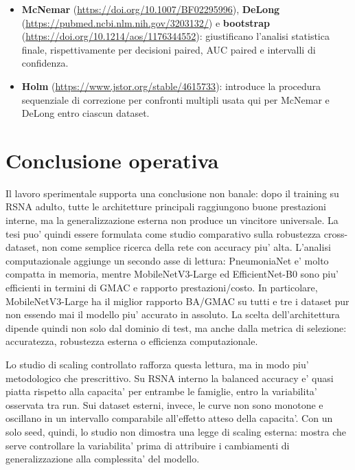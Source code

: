 \documentclass[11pt,a4paper]{article}
\newcommand{\balacc}{balanced accuracy}
\begin{document}
\begin{itemize}
  dell'esperimento multi-classe come test di trasferibilita' delle feature
  apprese sul task binario.
  \item \textbf{McNemar} \cite{mcnemar1947}
  (\url{https://doi.org/10.1007/BF02295996}), \textbf{DeLong}
  \cite{delong1988} (\url{https://pubmed.ncbi.nlm.nih.gov/3203132/}) e
  \textbf{bootstrap} \cite{efron1979bootstrap}
  (\url{https://doi.org/10.1214/aos/1176344552}): giustificano l'analisi
  statistica finale, rispettivamente per decisioni paired, AUC paired e
  intervalli di confidenza.
  \item \textbf{Holm} \cite{holm1979}
  (\url{https://www.jstor.org/stable/4615733}): introduce la procedura
  sequenziale di correzione per confronti multipli usata qui per McNemar e
  DeLong entro ciascun dataset.
\end{itemize}

\section{Conclusione operativa}

Il lavoro sperimentale supporta una conclusione non banale: dopo il training su
RSNA adulto, tutte le architetture principali raggiungono buone prestazioni
interne, ma la generalizzazione esterna non produce un vincitore universale. La
tesi puo' quindi essere formulata come studio comparativo sulla robustezza
cross-dataset, non come semplice ricerca della rete con accuracy piu' alta.
L'analisi computazionale aggiunge un secondo asse di lettura: PneumoniaNet e'
molto compatta in memoria, mentre MobileNetV3-Large ed EfficientNet-B0 sono piu'
efficienti in termini di GMAC e rapporto prestazioni/costo. In particolare,
MobileNetV3-Large ha il miglior rapporto BA/GMAC su tutti e tre i dataset pur
non essendo mai il modello piu' accurato in assoluto. La scelta
dell'architettura dipende quindi non solo dal dominio di test, ma anche dalla
metrica di selezione: accuratezza, robustezza esterna o efficienza
computazionale.

Lo studio di scaling controllato rafforza questa lettura, ma in modo piu'
metodologico che prescrittivo. Su RSNA interno la \balacc{} e' quasi piatta
rispetto alla capacita' per entrambe le famiglie, entro la variabilita' osservata
tra run. Sui dataset esterni, invece, le curve non sono monotone e oscillano in
un intervallo comparabile all'effetto atteso della capacita'. Con un solo seed,
quindi, lo studio non dimostra una legge di scaling esterna: mostra che serve
controllare la variabilita' prima di attribuire i cambiamenti di generalizzazione
alla complessita' del modello.
\end{document}
